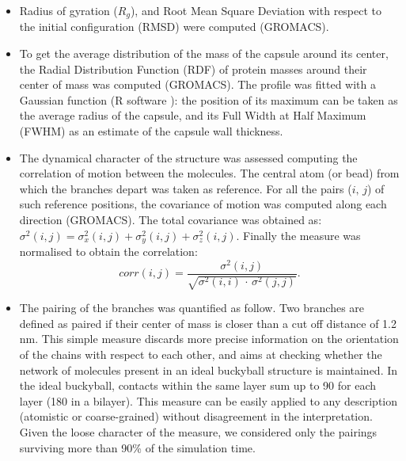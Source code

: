 \begin{itemize}
\item Radius of gyration ($R_g$), and Root Mean Square Deviation with respect to the initial configuration (RMSD) were computed (GROMACS).

\item To get the average distribution of the mass of the capsule around its center, the Radial Distribution Function (RDF) of protein masses around their center of mass was computed (GROMACS). The profile was fitted with a Gaussian function (R software \citep{R}): the position of its maximum can be taken as the average radius of the capsule, and its Full Width at Half Maximum (FWHM) as an estimate of the capsule wall thickness.

\item The dynamical character of the structure was assessed computing the correlation of motion between the molecules. The central atom (or bead) from which the branches depart was taken as reference. For all the pairs ($i, \, j$) of such reference positions, the covariance of motion was computed along each direction (GROMACS). The total covariance was obtained as: $\sigma^2(i,j) = \sigma_x^2(i,j) + \sigma_y^2(i,j) + \sigma_z^2(i,j)$. Finally the measure was normalised to obtain the correlation:
\begin{equation}
corr(i,j) = \frac{\sigma^2(i,j)}{\sqrt{\sigma^2(i,i)\,\cdot\,\sigma^2(j,j)}}.
\end{equation}

\item The pairing of the branches was quantified as follow. Two branches are defined as paired if their center of mass is closer than a cut off distance of 1.2 nm. This simple measure discards more precise information on the orientation of the chains with respect to each other, and aims at checking whether the network of molecules present in an ideal buckyball structure is maintained. In the ideal buckyball, contacts within the same layer sum up to 90 for each layer (180 in a bilayer). This measure can be easily applied to any description (atomistic or coarse-grained) without disagreement in the interpretation. Given the loose character of the measure, we considered only the pairings surviving more than 90\% of the simulation time.


\end{itemize}
